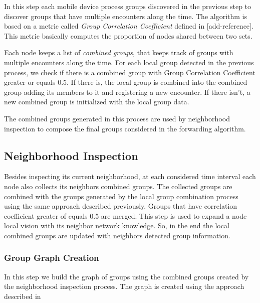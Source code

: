 In this step each mobile device process groups discovered in the previous step to discover groups that
have multiple encounters along the time. The algorithm is based on a metric called \textit{Group Correlation Coefficient} defined in [add-reference]. This metric basically computes the proportion of nodes shared between two sets.

Each node keeps a list of \textit{combined groups}, that keeps track of groups with multiple encounters along the time. For each
local group detected in the previous process, we check if there is a combined group with Group Correlation Coefficient greater or equals 0.5.
If there is, the local group is combined into the combined group adding its members to it and registering a new encounter. If there isn't, a new combined group is initialized with the local group data.

The combined groups generated in this process are used by neighborhood inspection to compose the final groups considered in the forwarding algorithm.

\subsection{Neighborhood Inspection}

Besides inspecting its current neighborhood, at each considered time interval each node also collects its neighbors combined groups. The collected groups are combined with the groups generated by the local group combination process using the same approach described previously. Groups that have correlation coefficient greater of equals 0.5 are merged. This step is used to expand a node local vision with its neighbor
network knowledge. So, in the end the local combined groups are updated with neighbors detected group information.

\subsubsection{Group Graph Creation}

In this step we build the graph of groups using the combined groups created by the neighborhood inspection process. The graph is created using the approach described in \cite{groupMobility}
